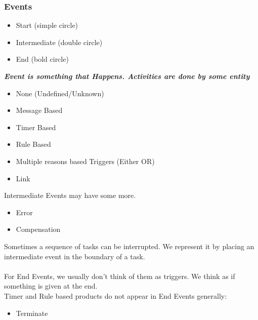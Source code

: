 \documentclass{article}
\begin{document}
            \subsubsection*{Events}
                \begin{itemize}
                    \item Start (simple circle)
                    \item Intermediate (double circle)
                    \item End (bold circle)
                \end{itemize}
                \textbf{\emph{Event is something that \emph{Happens}.
                Activities are done by some entity}}
                \begin{itemize}
                    \item None (Undefined/Unknown)
                    \item Message Based
                    \item Timer Based
                    \item Rule Based
                    \item Multiple reasons based Triggers (Either OR)
                    \item Link 
                \end{itemize}
                Intermediate Events may have some more.
                \begin{itemize}
                    \item Error
                    \item Compensation
                \end{itemize}
                Sometimes a sequence of tasks can be interrupted.
                We represent it by placing an intermediate event in the boundary of a task.
                \paragraph{}
                For End Events, we usually don't think of them as triggers. We think as if something is given at the end.\\
                Timer and Rule based products do not appear in End Events generally:
                \begin{itemize}
                    \item Terminate
                \end{itemize}
            
\end{document}
